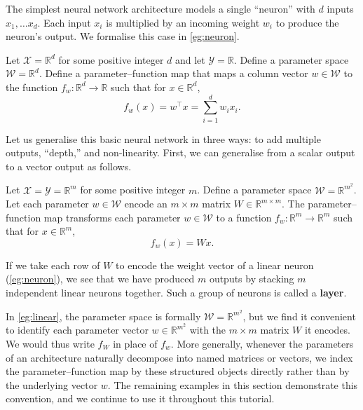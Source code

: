 \documentclass[11pt]{article}
\newcommand{\R}{\mathbb{R}}
\newcommand{\X}{\mathcal{X}}
\newcommand{\Y}{\mathcal{Y}}
\newcommand{\W}{\mathcal{W}}
\begin{document}
The simplest neural network architecture models a single ``neuron'' with $d$
inputs $x_1, \ldots x_d$. Each input $x_i$ is multiplied by an incoming weight
$w_i$ to produce the neuron's output. We formalise this case in
\cref{eg:neuron}.

\begin{example}\label{eg:neuron}
    Let $\X = \R^d$ for some positive integer $d$ and let $\Y = \R$. Define a
    parameter space $\W = \R^d$. Define a parameter--function map that maps a
    column vector $w \in \W$ to the function $f_w : \R^d \to \R$ such that for
    $x \in \R^d$,
    \begin{equation}
        f_w(x)
        = w^\top x
        = \sum_{i=1}^d w_i x_i.
    \end{equation}
\end{example}

Let us generalise this basic neural network in three ways: to add multiple
outputs, ``depth,'' and non-linearity. First, we can generalise from a scalar
output to a vector output as follows.

\begin{example}\label{eg:linear}
    Let $\X = \Y = \R^m$ for some positive integer $m$.
    Define a parameter space $\W = \R^{m^2}$. Let each parameter $w \in \W$
    encode an $m \times m$ matrix $W \in \R^{m \times m}$. The
    parameter--function map transforms each parameter $w \in \W$ to a function
    $f_w : \R^m \to \R^m$ such that for $x \in \R^m$,
    \begin{equation}
        f_w(x) = W x.
    \end{equation}
\end{example}

If we take each row of $W$ to encode the weight vector of a linear neuron
(\cref{eg:neuron}), we see that we have produced $m$ outputs by stacking $m$
independent linear neurons together. Such a group of neurons is called a
\textbf{layer}.

\begin{remark}[Encodings]
    In \cref{eg:linear}, the parameter space is formally $\W = \R^{m^2}$, but
    we find it convenient to identify each parameter vector $w \in \R^{m^2}$
    with the $m \times m$ matrix $W$ it encodes. We would thus write $f_W$ in
    place of $f_w$. More generally, whenever the parameters of an architecture
    naturally decompose into named matrices or vectors, we index the
    parameter--function map by these structured objects directly rather than by
    the underlying vector $w$. The remaining examples in this section
    demonstrate this convention, and we continue to use it throughout this
    tutorial.
\end{remark}
\end{document}
